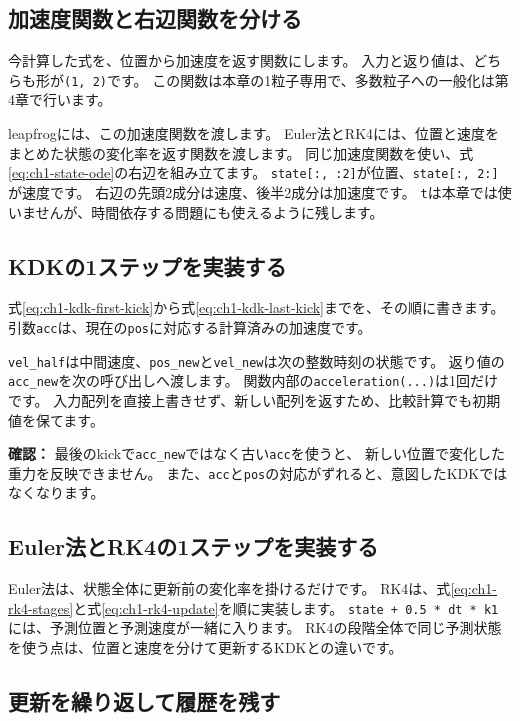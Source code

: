 \subsection{加速度関数と右辺関数を分ける}

今計算した式を、位置から加速度を返す関数にします。
入力と返り値は、どちらも形が\verb|(1, 2)|です。
この関数は本章の1粒子専用で、多数粒子への一般化は第4章で行います。

leapfrogには、この加速度関数を渡します。
Euler法とRK4には、位置と速度をまとめた状態の変化率を返す関数を渡します。
同じ加速度関数を使い、式\eqref{eq:ch1-state-ode}の右辺を組み立てます。
\verb|state[:, :2]|が位置、\verb|state[:, 2:]|が速度です。
右辺の先頭2成分は速度、後半2成分は加速度です。
\verb|t|は本章では使いませんが、時間依存する問題にも使えるように残します。

\subsection{KDKの1ステップを実装する}

式\eqref{eq:ch1-kdk-first-kick}から式\eqref{eq:ch1-kdk-last-kick}までを、その順に書きます。
引数\verb|acc|は、現在の\verb|pos|に対応する計算済みの加速度です。

\verb|vel_half|は中間速度、\verb|pos_new|と\verb|vel_new|は次の整数時刻の状態です。
返り値の\verb|acc_new|を次の呼び出しへ渡します。
関数内部の\verb|acceleration(...)|は1回だけです。
入力配列を直接上書きせず、新しい配列を返すため、比較計算でも初期値を保てます。

\textbf{確認：} 最後のkickで\verb|acc_new|ではなく古い\verb|acc|を使うと、
新しい位置で変化した重力を反映できません。
また、\verb|acc|と\verb|pos|の対応がずれると、意図したKDKではなくなります。

\subsection{Euler法とRK4の1ステップを実装する}

Euler法は、状態全体に更新前の変化率を掛けるだけです。
RK4は、式\eqref{eq:ch1-rk4-stages}と式\eqref{eq:ch1-rk4-update}を順に実装します。
\verb|state + 0.5 * dt * k1|には、予測位置と予測速度が一緒に入ります。
RK4の段階全体で同じ予測状態を使う点は、位置と速度を分けて更新するKDKとの違いです。

\subsection{更新を繰り返して履歴を残す}

